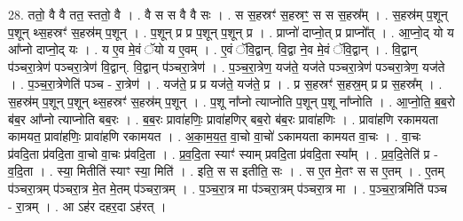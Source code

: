 \documentclass[17pt]{extarticle}
\begin{document}
28. ततो॒ वै वै तत॒ स्ततो॒ वै । . वै स स वै वै सः । . स स॒हस्रꣳ॑ स॒हस्रꣳ॒॒ स स स॒हस्र᳚म् । . स॒हस्र॑म् प॒शून् प॒शून् थ्स॒हस्रꣳ॑ स॒हस्र॑म् प॒शून् । . प॒शून् प्र प्र प॒शून् प॒शून् प्र । . प्राप्नो॑ दाप्नो॒त् प्र प्राप्नो᳚त् । . आ॒प्नो॒द् यो य आ᳚प्नो दाप्नो॒द् यः । . य ए॒व मे॒वं ॅयो य ए॒वम् । . ए॒वं ॅवि॒द्वान्. वि॒द्वा ने॒व मे॒वं ॅवि॒द्वान् । . वि॒द्वान् प॑ञ्चरा॒त्रेण॑ पञ्चरा॒त्रेण॑ वि॒द्वान्. वि॒द्वान् प॑ञ्चरा॒त्रेण॑ । . प॒ञ्च॒रा॒त्रेण॒ यज॑ते॒ यज॑ते पञ्चरा॒त्रेण॑ पञ्चरा॒त्रेण॒ यज॑ते । . प॒ञ्च॒रा॒त्रेणेति॑ पञ्च - रा॒त्रेण॑ । . यज॑ते॒ प्र प्र यज॑ते॒ यज॑ते॒ प्र । . प्र स॒हस्रꣳ॑ स॒हस्र॒म् प्र प्र स॒हस्र᳚म् । . स॒हस्र॑म् प॒शून् प॒शून् थ्स॒हस्रꣳ॑ स॒हस्र॑म् प॒शून् । . प॒शू ना᳚प्नो त्याप्नोति प॒शून् प॒शू ना᳚प्नोति । . आ॒प्नो॒ति॒ ब॒ब॒रो ब॑ब॒र आ᳚प्नो त्याप्नोति बब॒रः । . ब॒ब॒रः प्रावा॑हणिः॒ प्रावा॑हणिर् बब॒रो ब॑ब॒रः प्रावा॑हणिः । . प्रावा॑हणि रकामयता कामयत॒ प्रावा॑हणिः॒ प्रावा॑हणि रकामयत । . अ॒का॒म॒य॒त॒ वा॒चो वा॒चो॑ ऽकामयता कामयत वा॒चः । . वा॒चः प्र॑वदि॒ता प्र॑वदि॒ता वा॒चो वा॒चः प्र॑वदि॒ता । . प्र॒व॒दि॒ता स्याꣳ॑ स्याम् प्रवदि॒ता प्र॑वदि॒ता स्या᳚म् । . प्र॒व॒दि॒तेति॑ प्र - व॒दि॒ता । . स्या॒ मितीति॑ स्याꣳ स्या॒ मिति॑ । . इति॒ स स इतीति॒ सः । . स ए॒त मे॒तꣳ स स ए॒तम् । . ए॒तम् प॑ञ्चरा॒त्रम् प॑ञ्चरा॒त्र मे॒त मे॒तम् प॑ञ्चरा॒त्रम् । . प॒ञ्च॒रा॒त्र मा प॑ञ्चरा॒त्रम् प॑ञ्चरा॒त्र मा । . प॒ञ्च॒रा॒त्रमिति॑ पञ्च - रा॒त्रम् । . आ ऽह॑र दहर॒दा ऽह॑रत् । \newline
\end{document}
